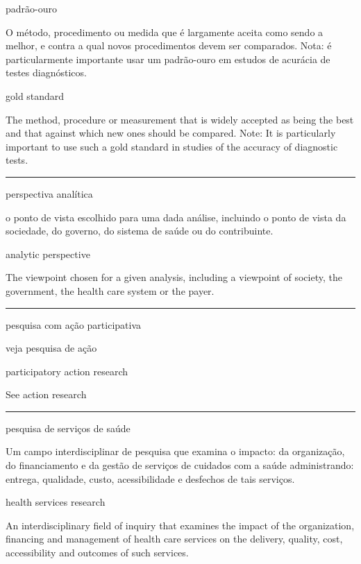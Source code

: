 \documentclass[
]{book}
\begin{document}
padrão-ouro

O método, procedimento ou medida que é largamente aceita como sendo a melhor, e contra a qual novos procedimentos devem ser comparados. Nota: é particularmente importante usar um padrão-ouro em estudos de acurácia de testes diagnósticos.

gold standard

The method, procedure or measurement that is widely accepted as being the best and that against which new ones should be compared. Note: It is particularly important to use such a gold standard in studies of the accuracy of diagnostic tests.

\begin{center}\rule{0.5\linewidth}{0.5pt}\end{center}

perspectiva analítica

o ponto de vista escolhido para uma dada análise, incluindo o ponto de vista da sociedade, do governo, do sistema de saúde ou do contribuinte.

analytic perspective

The viewpoint chosen for a given analysis, including a viewpoint of society, the government, the health care system or the payer.

\begin{center}\rule{0.5\linewidth}{0.5pt}\end{center}

pesquisa com ação participativa

veja pesquisa de ação

participatory action research

See action research

\begin{center}\rule{0.5\linewidth}{0.5pt}\end{center}

pesquisa de serviços de saúde

Um campo interdisciplinar de pesquisa que examina o impacto: da organização, do financiamento e da gestão de serviços de cuidados com a saúde administrando: entrega, qualidade, custo, acessibilidade e desfechos de tais serviços.

health services research

An interdisciplinary field of inquiry that examines the impact of the organization, financing and management of health care services on the delivery, quality, cost, accessibility and outcomes of such services.
\end{document}

